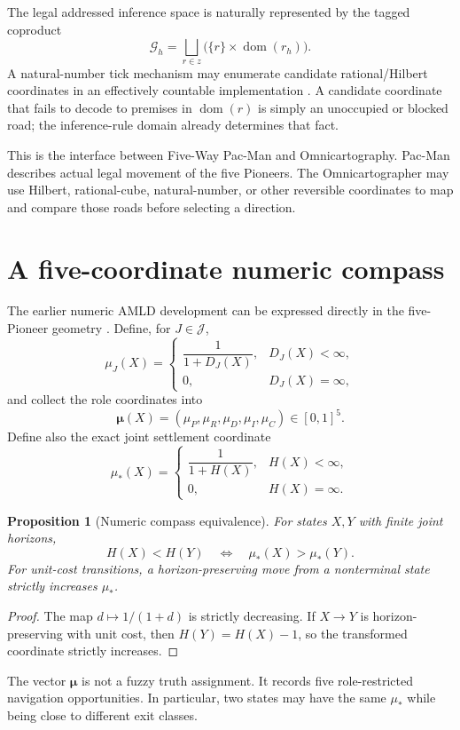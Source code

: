 \documentclass[11pt]{article}
\newtheorem{proposition}[definition]{Proposition}
\theoremstyle{remark}
\newcommand{\Roles}{\mathcal J}
\begin{document}
The legal addressed inference space is naturally represented by the tagged coproduct
\[
\mathcal G_h
=
\bigsqcup_{r\in z}
\bigl(\{r\}\times \operatorname{dom}(r_h)\bigr).
\]
A natural-number tick mechanism may enumerate candidate rational/Hilbert coordinates in an effectively countable implementation \cite{TickAddressing}. A candidate coordinate that fails to decode to premises in $\operatorname{dom}(r)$ is simply an unoccupied or blocked road; the inference-rule domain already determines that fact.

This is the interface between Five-Way Pac-Man and Omnicartography. Pac-Man describes actual legal movement of the five Pioneers. The Omnicartographer may use Hilbert, rational-cube, natural-number, or other reversible coordinates to map and compare those roads before selecting a direction.

\section{A five-coordinate numeric compass}

The earlier numeric AMLD development can be expressed directly in the five-Pioneer geometry \cite{NumericAMLD}. Define, for $J\in\Roles$,
\[
\mu_J(X)=
\begin{cases}
\dfrac{1}{1+D_J(X)},&D_J(X)<\infty,\\[1.1ex]
0,&D_J(X)=\infty,
\end{cases}
\]
and collect the role coordinates into
\[
\boldsymbol{\mu}(X)
=
(\mu_P,\mu_R,\mu_D,\mu_I,\mu_C)\in[0,1]^5.
\]
Define also the exact joint settlement coordinate
\[
\mu_*(X)=
\begin{cases}
\dfrac{1}{1+H(X)},&H(X)<\infty,\\[1.1ex]
0,&H(X)=\infty.
\end{cases}
\]

\begin{proposition}[Numeric compass equivalence]
For states $X,Y$ with finite joint horizons,
\[
H(X)<H(Y)\quad\Longleftrightarrow\quad \mu_*(X)>\mu_*(Y).
\]
For unit-cost transitions, a horizon-preserving move from a nonterminal state strictly increases $\mu_*$.
\end{proposition}
\begin{proof}
The map $d\mapsto 1/(1+d)$ is strictly decreasing. If $X\to Y$ is horizon-preserving with unit cost, then $H(Y)=H(X)-1$, so the transformed coordinate strictly increases.
\end{proof}

The vector $\boldsymbol{\mu}$ is not a fuzzy truth assignment. It records five role-restricted navigation opportunities. In particular, two states may have the same $\mu_*$ while being close to different exit classes.
\end{document}
